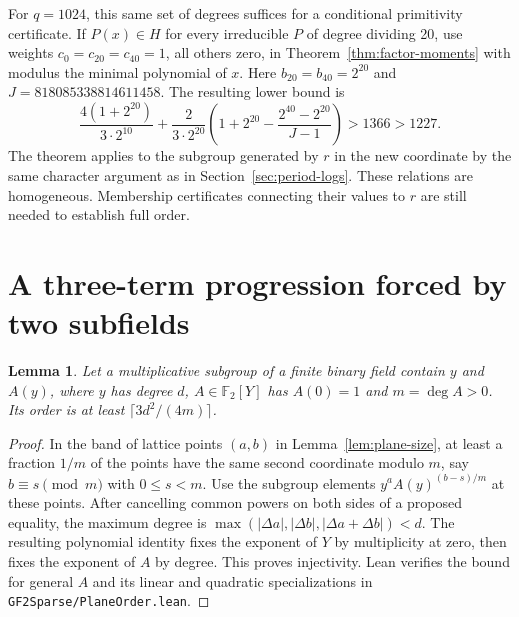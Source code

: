 \documentclass[11pt]{article}
\newtheorem{lemma}[theorem]{Lemma}
\newcommand{\F}{\mathbb F_2}
\begin{document}
For \(q=1024\), this same set of degrees suffices for a conditional
primitivity certificate. If \(P(x)\in H\) for every irreducible \(P\)
of degree dividing 20, use weights \(c_0=c_{20}=c_{40}=1\), all
others zero, in Theorem~\ref{thm:factor-moments} with modulus the
minimal polynomial of \(x\). Here \(b_{20}=b_{40}=2^{20}\) and
\(J=818085338814611458\). The resulting lower bound is
\[
  \frac{4(1+2^{20})}{3\cdot2^{10}}+
  \frac{2}{3\cdot2^{20}}\left(1+2^{20}-
           \frac{2^{40}-2^{20}}{J-1}\right)>1366>1227 .
\]
The theorem applies to the subgroup generated by \(r\) in the new
coordinate by the same character argument as in
Section~\ref{sec:period-logs}. These relations are homogeneous.
Membership certificates connecting their values to \(r\) are still
needed to establish full order.

\section{A three-term progression forced by two subfields}
\begin{lemma}\label{lem:weighted-plane}
Let a multiplicative subgroup of a finite binary field contain \(y\)
and \(A(y)\), where \(y\) has degree \(d\), \(A\in\F[Y]\) has
\(A(0)=1\) and \(m=\deg A>0\). Its order is at least
\(\lceil 3d^2/(4m)\rceil\).
\end{lemma}
\begin{proof}
In the band of lattice points \((a,b)\) in Lemma~\ref{lem:plane-size},
at least a fraction \(1/m\) of the points have the same second
coordinate modulo \(m\), say \(b\equiv s\pmod m\) with \(0\le s<m\).
Use the subgroup elements \(y^a A(y)^{(b-s)/m}\) at these points.
After cancelling common powers on both sides of a proposed equality,
the maximum degree is \(\max(|\Delta a|,|\Delta b|,|\Delta a+\Delta b|)<d\).
The resulting polynomial identity fixes the exponent of \(Y\) by
multiplicity at zero, then fixes the exponent of \(A\) by degree.
This proves injectivity. Lean verifies the bound for general \(A\)
and its linear and quadratic specializations in
\nolinkurl{GF2Sparse/PlaneOrder.lean}.
\end{proof}
\end{document}
